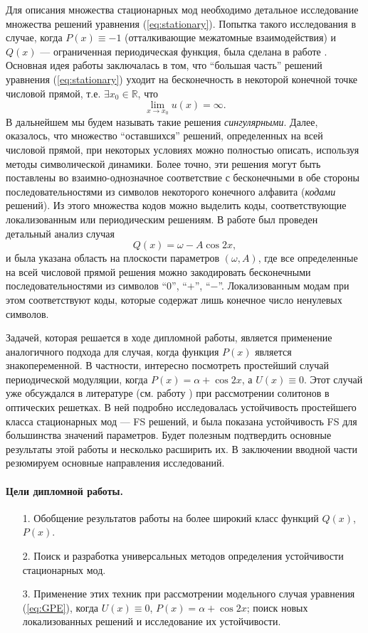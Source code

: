 Для описания множества стационарных мод необходимо детальное исследование множества решений уравнения (\ref{eq:stationary}).
Попытка такого исследования в случае, когда $P(x) \equiv -1$ (отталкивающие межатомные взаимодействия) и $Q(x)$ --- ограниченная периодическая функция, была сделана в работе \cite{AlfAvr}.
Основная идея работы \cite{AlfAvr} заключалась в том, что ``большая часть'' решений уравнения (\ref{eq:stationary}) уходит на бесконечность в некоторой конечной точке числовой прямой, т.е. $\exists x_0 \in \mathbb{R}$, что
$$\lim \limits_{x \to x_0} u(x) = \infty.$$
В дальнейшем мы будем называть такие решения {\it сингулярными}.
Далее, оказалось, что множество ``оставшихся'' решений, определенных на всей числовой прямой, при некоторых условиях можно полностью описать, используя методы символической динамики.
Более точно, эти решения могут быть поставлены во взаимно-однозначное соответствие с бесконечными в обе стороны последовательностями из символов некоторого конечного алфавита ({\it кодами} решений).
Из этого множества кодов можно выделить коды, соответствующие локализованным или периодическим решениям.
В работе \cite{AlfAvr} был проведен детальный анализ случая
$$Q(x) = \omega - A \cos 2x,$$
и была указана область на плоскости параметров $(\omega, A)$, где все определенные на всей числовой прямой решения можно закодировать бесконечными последовательностями из символов ``$0$'',  ``$+$'', ``$-$''.
Локализованным модам при этом соответствуют коды, которые содержат лишь конечное число ненулевых символов.

Задачей, которая решается в ходе дипломной работы, является применение аналогичного подхода для случая, когда функция $P(x)$ является знакопеременной.
В частности, интересно посмотреть простейший случай периодической модуляции, когда $P(x) = \alpha + \cos 2x$, а $U(x) \equiv 0$.
Этот случай уже обсуждался в литературе (см. работу \cite{Malomed}) при рассмотрении солитонов в оптических решетках.
В ней подробно исследовалась устойчивость простейшего класса стационарных мод --- FS решений, и была показана устойчивость FS для большинства значений параметров.
Будет полезным подтвердить основные результаты этой работы и несколько расширить их.
В заключении вводной части резюмируем основные направления исследований.

\paragraph{Цели дипломной работы.}
\begin{itemize}
\item[1.] Обобщение результатов работы \cite{AlfAvr} на более широкий класс функций $Q(x)$, $P(x)$.
\item[2.] Поиск и разработка универсальных методов определения устойчивости стационарных мод.
\item[3.] Применение этих техник при рассмотрении модельного случая уравнения (\ref{eq:GPE}), когда $U(x) \equiv 0$, $P(x) = \alpha + \cos 2x$; поиск новых локализованных решений и исследование их устойчивости.
\end{itemize}
